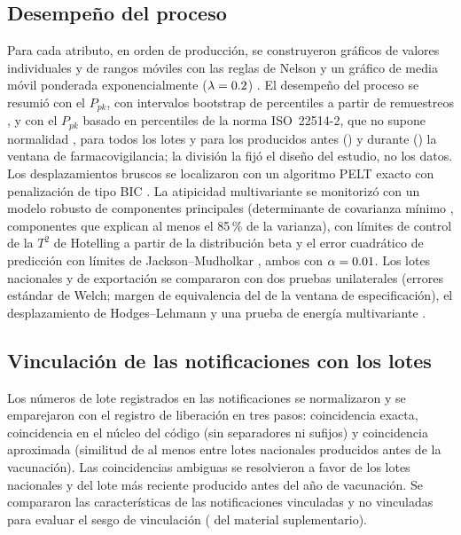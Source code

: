 \documentclass[11pt]{article}
\begin{document}
\subsection{Desempeño del proceso}\label{sec:m-spc}
Para cada atributo, en orden de producción, se construyeron gráficos de valores individuales y de
rangos móviles con las reglas de Nelson \cite{Nelson1984,Montgomery2019} y un gráfico de media móvil
ponderada exponencialmente ($\lambda=\num{0.2}$) \cite{Lucas1990}. El desempeño del proceso se
resumió con el $P_{pk}$, con intervalos bootstrap de percentiles a partir de \PTCapBootstrap{}
remuestreos \cite{Efron1987}, y con el $P_{pk}$ basado en percentiles de la norma ISO~22514-2, que no
supone normalidad \cite{ISO22514-2}, para todos los lotes y para los producidos antes
(\PTPeriodOne) y durante (\PTPeriodTwo) la ventana de farmacovigilancia; la división la fijó el
diseño del estudio, no los datos. Los desplazamientos bruscos se localizaron con un algoritmo PELT
exacto con penalización de tipo BIC \cite{Killick2012,Truong2020}. La atipicidad multivariante se
monitorizó con un modelo robusto de componentes principales (determinante de covarianza mínimo
\cite{Rousseeuw1999}, componentes que explican al menos el 85\,\% de la varianza), con límites de
control de la $T^2$ de Hotelling a partir de la distribución beta \cite{Tracy1992} y el error
cuadrático de predicción con límites de Jackson--Mudholkar \cite{Jackson1979,MacGregor1995}, ambos con
$\alpha=\num{0.01}$. Los lotes nacionales y de exportación se compararon con dos pruebas
unilaterales \cite{Schuirmann1987} (errores estándar de Welch; margen de equivalencia del
\PTEqMarginPct{} de la ventana de especificación), el desplazamiento de Hodges--Lehmann
\cite{Hodges1963} y una prueba de energía multivariante \cite{Szekely2013}.

\subsection{Vinculación de las notificaciones con los lotes}\label{sec:m-link}
Los números de lote registrados en las notificaciones se normalizaron y se emparejaron con el
registro de liberación en tres pasos: coincidencia exacta, coincidencia en el núcleo del código (sin
separadores ni sufijos) y coincidencia aproximada (similitud de al menos \PTFuzzyThreshold{} entre
lotes nacionales producidos antes de la vacunación). Las coincidencias ambiguas se resolvieron a
favor de los lotes nacionales y del lote más reciente producido antes del año de vacunación. Se
compararon las características de las notificaciones vinculadas y no vinculadas para evaluar el
sesgo de vinculación ( del material suplementario).
\end{document}
